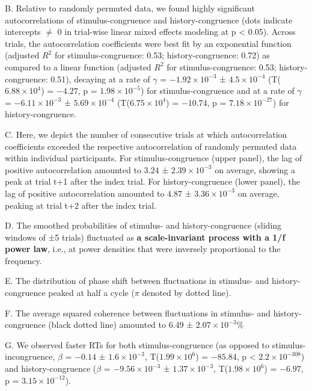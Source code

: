 \documentclass[
]{article}
\begin{document}
B. Relative to randomly permuted data, we found highly significant
autocorrelations of stimulus-congruence and history-congruence (dots
indicate intercepts \(\neq\) 0 in trial-wise linear mixed effects
modeling at p \textless{} 0.05). Across trials, the autocorrelation
coefficients were best fit by an exponential function (adjusted \(R^2\)
for stimulus-congruence: 0.53; history-congruence: 0.72) as compared to
a linear function (adjusted \(R^2\) for stimulus-congruence: 0.53;
history-congruence: 0.51), decaying at a rate of \(\gamma\) =
\(\ensuremath{-1.92\times 10^{-3}}\) ±
\(\ensuremath{4.5\times 10^{-4}}\)
(T(\(\ensuremath{6.88\times 10^{4}}\)) = \(-4.27\), p =
\(\ensuremath{1.98\times 10^{-5}}\)) for stimulus-congruence and at a
rate of \(\gamma\) = \(\ensuremath{-6.11\times 10^{-3}}\) ±
\(\ensuremath{5.69\times 10^{-4}}\)
(T(\(\ensuremath{6.75\times 10^{4}}\)) = \(-10.74\), p =
\(\ensuremath{7.18\times 10^{-27}}\)) for history-congruence.

C. Here, we depict the number of consecutive trials at which
autocorrelation coefficients exceeded the respective autocorrelation of
randomly permuted data within individual participants. For
stimulus-congruence (upper panel), the lag of positive autocorrelation
amounted to \(3.24\) ± \(\ensuremath{2.39\times 10^{-3}}\) on average,
showing a peak at trial t+1 after the index trial. For
history-congruence (lower panel), the lag of positive autocorrelation
amounted to \(4.87\) ± \(\ensuremath{3.36\times 10^{-3}}\) on average,
peaking at trial t+2 after the index trial.

D. The smoothed probabilities of stimulus- and history-congruence
(sliding windows of ±5 trials) fluctuated as \textbf{a scale-invariant
process with a 1/f power law}, i.e., at power densities that were
inversely proportional to the frequency.

E. The distribution of phase shift between fluctuations in stimulus- and
history-congruence peaked at half a cycle (\(\pi\) denoted by dotted
line).

F. The average squared coherence between fluctuations in stimulus- and
history-congruence (black dotted line) amounted to \(6.49\) ±
\(\ensuremath{2.07\times 10^{-3}}\)\%

G. We observed faster RTs for both stimulus-congruence (as opposed to
stimulus-incongruence, \(\beta\) = \(-0.14\) ±
\(\ensuremath{1.6\times 10^{-3}}\),
T(\(\ensuremath{1.99\times 10^{6}}\)) = \(-85.84\), p < \(\ensuremath{2.2\times 10^{-308}}\)) and
history-congruence (\(\beta\) = \(\ensuremath{-9.56\times 10^{-3}}\) ±
\(\ensuremath{1.37\times 10^{-3}}\),
T(\(\ensuremath{1.98\times 10^{6}}\)) = \(-6.97\), p =
\(\ensuremath{3.15\times 10^{-12}}\)).
\end{document}
